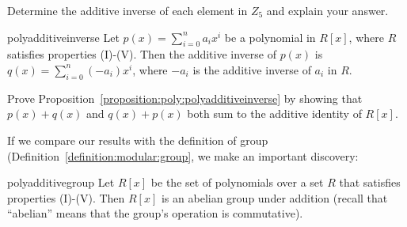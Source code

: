 \begin{exercise}{}
Determine the additive inverse of each element in $Z_5$ and explain your answer.
\end{exercise}


\begin{prop}{polyadditiveinverse} Let $p(x)=\sum_{i=0}^n a_i x^i$ be a polynomial in $R[x]$, where $R$ satisfies properties (I)-(V). Then the additive inverse of $p(x)$ is $q(x)=\sum_{i=0}^n (-a_i) x^i$, where $-a_i$ is the additive inverse of $a_i$ in $R$.
\end{prop}

\begin{exercise}{}
Prove Proposition~\ref{proposition:poly:polyadditiveinverse} by showing that $p(x) + q(x)$ and $q(x)+ p(x)$ both sum to the additive identity of $R[x]$.
\end{exercise}

%

If we compare our results with the definition of group (Definition~\ref{definition:modular:group}, we make an important discovery: 

\begin{prop}{polyadditivegroup} Let $R[x]$ be the  set of polynomials over a set $R$ that satisfies properties (I)-(V). Then $R[x]$ is an abelian group under addition (recall that ``abelian'' means that the group's operation is commutative). 
\end{prop}

